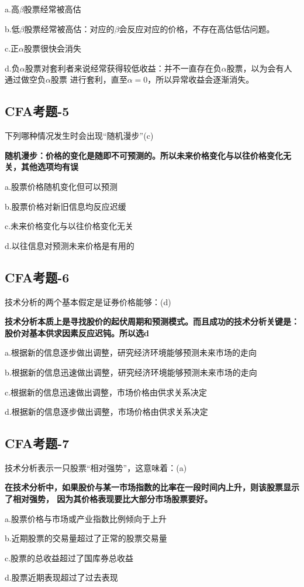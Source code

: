 \documentclass{article}
\begin{document}
a.高$\beta$股票经常被高估

b.低$\beta$股票经常被高估：对应的$\beta$会反应对应的价格，不存在高估低估问题。

c.正$\alpha$股票很快会消失

d.负$\alpha$股票对套利者来说经常获得较低收益：并不一直存在负$\alpha$股票，以为会有人通过做空负$\alpha$股票
进行套利，直至$\alpha=0$，所以异常收益会逐渐消失。
\subsection*{CFA考题-5}
下列哪种情况发生时会出现“随机漫步”(c)

\textbf{随机漫步：价格的变化是随即不可预测的。所以未来价格变化与以往价格变化无关，其他选项均有误}

a.股票价格随机变化但可以预测

b.股票价格对新旧信息均反应迟缓

c.未来价格变化与以往价格变化无关

d.以往信息对预测未来价格是有用的
\clearpage
\subsection*{CFA考题-6}
技术分析的两个基本假定是证券价格能够：(d)

\textbf{技术分析本质上是寻找股价的起伏周期和预测模式。而且成功的技术分析关键是：
股价对基本供求因素反应迟钝。所以选d}

a.根据新的信息逐步做出调整，研究经济环境能够预测未来市场的走向

b.根据新的信息迅速做出调整，研究经济环境能够预测未来市场的走向

c.根据新的信息迅速做出调整，市场价格由供求关系决定

d.根据新的信息逐步做出调整，市场价格由供求关系决定
\subsection*{CFA考题-7}
技术分析表示一只股票“相对强势”，这意味着：(a)

\textbf{在技术分析中，如果股价与某一市场指数的比率在一段时间内上升，则该股票显示了相对强势，
因为其价格表现要比大部分市场股票要好。}

a.股票价格与市场或产业指数比例倾向于上升

b.近期股票的交易量超过了正常的股票交易量

c.股票的总收益超过了国库券总收益

d.股票近期表现超过了过去表现
\end{document}
